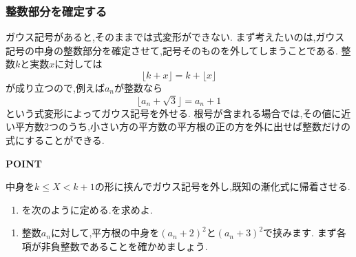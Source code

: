 \subsubsection{整数部分を確定する}\label{節：整数部分を確定する}
ガウス記号があると,そのままでは式変形ができない.
まず考えたいのは,ガウス記号の中身の整数部分を確定させて,記号そのものを外してしまうことである.
整数$k$と実数$x$に対しては
\[
  \lfloor k+x\rfloor=k+\lfloor x\rfloor
\]
が成り立つので,例えば$a_n$が整数なら
\[
  \lfloor a_n+\sqrt3\rfloor=a_n+1
\]  
という式変形によってガウス記号を外せる.
根号が含まれる場合では,その値に近い平方数2つのうち,小さい方の平方数の平方根の正の方を外に出せば整数だけの式にすることができる.

\begin{bookpoint}
  \textbf{POINT}\par
  中身を$k \le X<k+1$の形に挟んでガウス記号を外し,既知の漸化式に帰着させる.
\end{bookpoint}

\noindent {}\par\nobreak
\begin{enumerate}[label=(\arabic*),parsep=3pt,beginpenalty=10000,format=\bookitemlink{example-gauss-role-1}{problem}{hint}]
  \item {}を次のように定める.を求めよ.
    \BookMathLayout{            \[
        a_1=1,\qquad
        a_{n+1}=\left\lfloor\sqrt{a_n^2+4a_n+5}\right\rfloor
        \quad(n\ge1).
      \]}{            \[
        \begin{aligned}
          a_1&=1,\\
          a_{n+1}&=\left\lfloor\sqrt{a_n^2+4a_n+5}\right\rfloor
          \\              &\quad(n\ge1).
        \end{aligned}
      \]}
\end{enumerate}

\noindent {}\par\nobreak
\begin{enumerate}[label=(\arabic*),parsep=3pt,beginpenalty=10000,format=\bookitemlink{example-gauss-role-1}{hint}{answer}]
  \item 整数$a_n$に対して,平方根の中身を$(a_n+2)^2$と$(a_n+3)^2$で挟みます.
    まず各項が非負整数であることを確かめましょう.
\end{enumerate}

